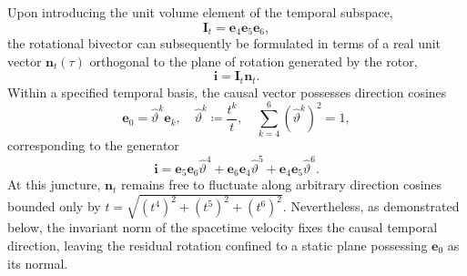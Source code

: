 Upon introducing the unit volume element of the temporal subspace,
\begin{equation}
    \mathbf{I}_{t} = \mathbf{e}_{4}\mathbf{e}_{5}\mathbf{e}_{6},
\end{equation}
the rotational bivector can subsequently be formulated in terms of a real unit vector $\mathbf{n}_{t}(\tau)$ orthogonal to the plane of rotation generated by the rotor,
\begin{equation}
    \mathbf{i} = \mathbf{I}_{t}\mathbf{n}_{t}.
\end{equation}
Within a specified temporal basis, the causal vector possesses direction cosines
\begin{equation}
    \mathbf{e}_{0} = \hat{\vartheta}^{k}\mathbf{e}_{k}, \quad \hat{\vartheta}^{k} \coloneqq \frac{t^{k}}{t}, \quad \sum_{k=4}^{6}(\hat{\vartheta}^{k})^{2} = 1,
\end{equation}
corresponding to the generator
\begin{equation}
    \mathbf{i} = \mathbf{e}_{5}\mathbf{e}_{6}\hat{\vartheta}^{4} + \mathbf{e}_{6}\mathbf{e}_{4}\hat{\vartheta}^{5} + \mathbf{e}_{4}\mathbf{e}_{5}\hat{\vartheta}^{6}.
\end{equation}
At this juncture, $\mathbf{n}_{t}$ remains free to fluctuate along arbitrary direction cosines bounded only by $t = \sqrt{(t^{4})^{2} + (t^{5})^{2} + (t^{6})^{2}}$. Nevertheless, as demonstrated below, the invariant norm of the spacetime velocity fixes the causal temporal direction, leaving the residual rotation confined to a static plane possessing $\mathbf{e}_{0}$ as its normal.

